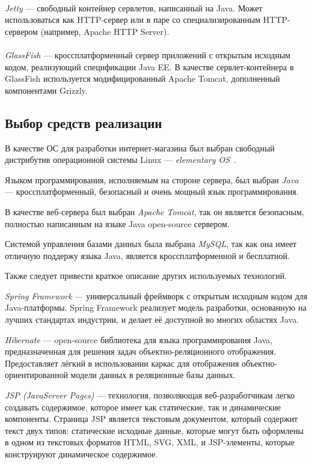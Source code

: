 \paragraph{}
\textit{Jetty} --- свободный контейнер сервлетов, написанный на Java. Может использоваться
как HTTP-сервер или в паре со специализированным HTTP-сервером (например, Apache HTTP Server).

\paragraph{}
\textit{GlassFish} --- кроссплатформенный сервер приложений с открытым исходным кодом,
реализующий спецификации Java EE. В качестве сервлет-контейнера в GlassFish используется
модифицированный Apache Tomcat, дополненный компонентами Grizzly.


\subsection{Выбор средств реализации}
\label{sub:choice_results}

В качестве ОС для разработки интернет-магазина был выбран свободный дистрибутив
операционной системы Linux --- \textit{elementary OS}~\cite{elementary_os}.

Языком программирования, исполняемым на стороне сервера, был выбран \textit{Java} ---
кроссплатформенный, безопасный и очень мощный язык программирования.

В качестве веб-сервера был выбран \textit{Apache Tomcat}, так он является безопасным,
полностью написанным на языке Java open-source сервером.

Системой управления базами данных была выбрана \textit{MySQL}, так как она имеет отличную
поддержу языка Java, является кроссплатформенной и бесплатной.

Также следует привести краткое описание других используемых технологий.

\textit{Spring Framework} --- универсальный фреймворк с открытым исходным
кодом для Java-платформы. Spring Framework реализует модель разработки, основанную
на лучших стандартах индустрии, и делает её доступной во многих областях Java.

\textit{Hibernate} --- open-source библиотека для языка программирования Java,
предназначенная для решения задач объектно-реляционного отображения. Предоставляет
лёгкий в использовании каркас для отображения объектно-ориентированной модели данных
в реляционные базы данных.

\textit{JSP (JavaServer Pages)} --- технология, позволяющая веб-разработчикам
легко создавать содержимое, которое имеет как статические, так и динамические компоненты.
Страница JSP является текстовым документом, который содержит текст двух типов:
статические исходные данные, которые могут быть оформлены в одном из текстовых
форматов HTML, SVG, XML, и JSP-элементы, которые конструируют динамическое содержимое.


